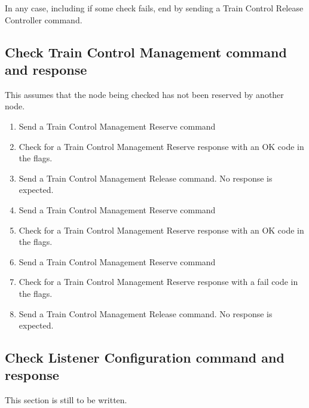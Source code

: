 In any case, including if some check fails, end by sending a Train Control Release
Controller command.


\subsection{Check Train Control Management command and response}

This assumes that the node being checked has not been reserved by another node.

\begin{enumerate}

    \item Send a Train Control Management Reserve command
    \item Check for a Train Control Management Reserve response with an OK code in the flags.

    \item Send a Train Control Management Release command.  No response is expected.

    \item Send a Train Control Management Reserve command
    \item Check for a Train Control Management Reserve response with an OK code in the flags.

    \item Send a Train Control Management Reserve command
    \item Check for a Train Control Management Reserve response with a fail code in the flags.
    
    \item Send a Train Control Management Release command.  No response is expected.

\end{enumerate}


\subsection{Check Listener Configuration command and response}

This section is still to be written.

  
